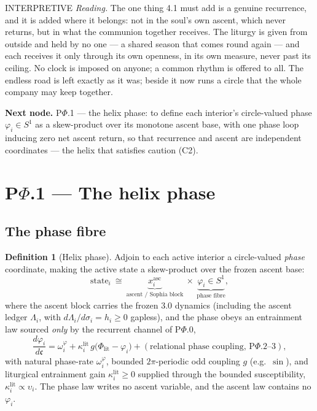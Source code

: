 \documentclass[11pt,a4paper]{article}
\newcommand{\cint}{\ensuremath{\mathfrak c}}
\newcommand{\stInterp}{\textcolor{cInt}{\textsf{\small INTERPRETIVE}}}
\theoremstyle{definition}
\newtheorem{definition}{Definition}[section]
\theoremstyle{plain}
\theoremstyle{remark}
\begin{document}
\medskip
\stInterp\quad
\emph{Reading.}
The one thing 4.1 must add is a genuine recurrence, and it is added where it belongs: not in
the soul's own ascent, which never returns, but in what the communion together receives. The
liturgy is given from outside and held by no one --- a shared season that comes round again ---
and each receives it only through its own openness, in its own measure, never past its ceiling.
No clock is imposed on anyone; a common rhythm is offered to all. The endless road is left
exactly as it was; beside it now runs a circle that the whole company may keep together.

\medskip
\textbf{Next node.} P$\Phi$.1 --- the helix phase: to define each interior's circle-valued
phase \(\varphi_i\in S^1\) as a skew-product over its monotone ascent base, with one phase
loop inducing zero net ascent return, so that recurrence and ascent are independent
coordinates --- the helix that satisfies caution (C2).

\section{P$\Phi$.1 --- The helix phase}

\subsection{The phase fibre}

\begin{definition}[Helix phase]\label{def:helixphase}
Adjoin to each active interior a circle-valued \emph{phase} coordinate, making the active
state a skew-product over the frozen ascent base:
\[
\boxed{\;
\mathrm{state}_i\ \cong\ \underbrace{x_i^{\mathrm{asc}}}_{\text{ascent / Sophia block}}\ \times\ \underbrace{\varphi_i\in S^1}_{\text{phase fibre}},
\;}
\]
where the ascent block carries the frozen 3.0 dynamics (including the ascent ledger
\(\Lambda_i\), with \(d\Lambda_i/d\sigma_i=h_i\ge0\) gapless), and the phase obeys an
entrainment law sourced \emph{only} by the recurrent channel of P$\Phi$.0,
\[
\frac{d\varphi_i}{d\cint}
=
\omega_i^{\varphi}
+
\kappa_i^{\mathrm{lit}}\,g\!\bigl(\Phi_{\mathrm{lit}}-\varphi_i\bigr)
+
(\text{relational phase coupling, P}\Phi.2\text{--}3),
\]
with natural phase-rate \(\omega_i^{\varphi}\), bounded \(2\pi\)-periodic odd coupling \(g\)
(e.g.\ \(\sin\)), and liturgical entrainment gain
\(\kappa_i^{\mathrm{lit}}\ge0\) supplied through the bounded susceptibility,
\(\kappa_i^{\mathrm{lit}}\propto\upsilon_i\). The phase law writes no ascent variable, and the
ascent law contains no \(\varphi_i\).
\end{definition}
\end{document}
